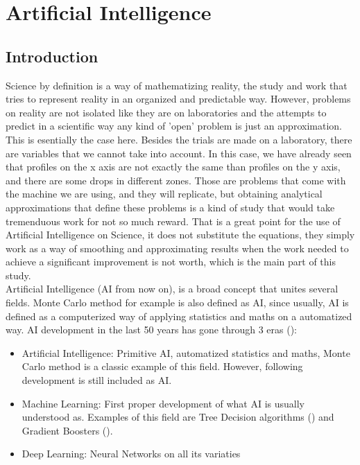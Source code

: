 \documentclass[openany]{article}
\begin{document}
\newpage 


\section{Artificial Intelligence}

\subsection{Introduction}

Science by definition is a way of mathematizing reality, the study and work that tries to represent reality in an organized and predictable way. However, problems on reality are not isolated like they are on laboratories and the attempts to predict in a scientific way any kind of 'open' problem is just an approximation. This is esentially the case here. Besides the trials are made on a laboratory, there are variables that we cannot take into account. In this case, we have already seen that profiles on the x axis are not exactly the same than profiles on the y axis, and there are some drops in different zones. Those are problems that come with the machine we are using, and they will replicate, but obtaining analytical approximations that define these problems is a kind of study that would take tremenduous work for not so much reward. That is a great point for the use of Artificial Intelligence on Science, it does not substitute the equations, they simply work as a way of smoothing and approximating results when the work needed to achieve a significant improvement is not worth, which is the main part of this study.\\

Artificial Intelligence (AI from now on), is a broad concept that unites several fields. Monte Carlo method for example is also defined as AI, since usually, AI is defined as a computerized way of applying statistics and maths on a automatized way. AI development in the last 50 years has gone through 3 eras (\cite{8259629, BINI20182358}):

\begin{itemize}
	\item Artificial Intelligence: Primitive AI, automatized statistics and maths, Monte Carlo method is a classic example of this field. However, following development is still included as AI.
	\item Machine Learning: First proper development of what AI is usually understood as. Examples of this field are Tree Decision algorithms (\cite{palmer1979number, batra1975classification}) and Gradient Boosters (\cite{FREUND1997119}).
	\item Deep Learning: Neural Networks on all its variaties
\end{itemize}
\end{document}
